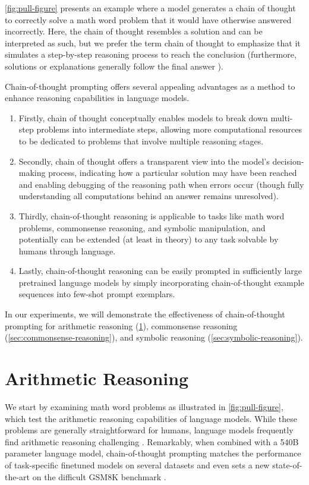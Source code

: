 \cref{fig:pull-figure} presents an example where a model generates a chain of thought to correctly solve a math word problem that it would have otherwise answered incorrectly. Here, the chain of thought resembles a solution and can be interpreted as such, but we prefer the term chain of thought to emphasize that it simulates a step-by-step reasoning process to reach the conclusion (furthermore, solutions or explanations generally follow the final answer \citep[][\textit{inter alia}]{narang2020wt5,wiegreffe2021reframing,lampinen2022can}).

Chain-of-thought prompting offers several appealing advantages as a method to enhance reasoning capabilities in language models.

\begin{enumerate}[topsep=1pt,itemsep=0ex]
    \item Firstly, chain of thought conceptually enables models to break down multi-step problems into intermediate steps, allowing more computational resources to be dedicated to problems that involve multiple reasoning stages.
    \item Secondly, chain of thought offers a transparent view into the model’s decision-making process, indicating how a particular solution may have been reached and enabling debugging of the reasoning path when errors occur (though fully understanding all computations behind an answer remains unresolved).
    \item Thirdly, chain-of-thought reasoning is applicable to tasks like math word problems, commonsense reasoning, and symbolic manipulation, and potentially can be extended (at least in theory) to any task solvable by humans through language.
    \item Lastly, chain-of-thought reasoning can be easily prompted in sufficiently large pretrained language models by simply incorporating chain-of-thought example sequences into few-shot prompt exemplars.
\end{enumerate}

In our experiments, we will demonstrate the effectiveness of chain-of-thought prompting for arithmetic reasoning (\cref{sec:arithmetic-reasoning}), commonsense reasoning (\cref{sec:commonsense-reasoning}), and symbolic reasoning (\cref{sec:symbolic-reasoning}).

\section{Arithmetic Reasoning}\label{sec:arithmetic-reasoning}
We start by examining math word problems as illustrated in \cref{fig:pull-figure}, which test the arithmetic reasoning capabilities of language models. While these problems are generally straightforward for humans, language models frequently find arithmetic reasoning challenging \citep[][\textit{inter alia}]{hendrycks2021measuring,patel-etal-2021-nlp}. Remarkably, when combined with a 540B parameter language model, chain-of-thought prompting matches the performance of task-specific finetuned models on several datasets and even sets a new state-of-the-art on the difficult GSM8K benchmark \citep{cobbe2021training}.

